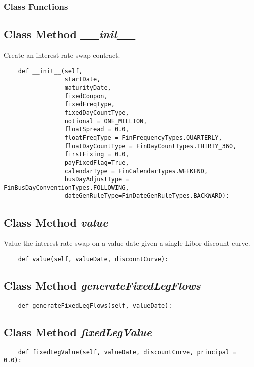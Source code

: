 \documentclass[twoside,11pt]{book}
\begin{document}
\subsubsection{Class Functions}

\subsection{Class Method {\it \_\_init\_\_}}
Create an interest rate swap contract. 

\begin{lstlisting}
    def __init__(self, 
                 startDate, 
                 maturityDate,
                 fixedCoupon, 
                 fixedFreqType, 
                 fixedDayCountType,
                 notional = ONE_MILLION,
                 floatSpread = 0.0, 
                 floatFreqType = FinFrequencyTypes.QUARTERLY, 
                 floatDayCountType = FinDayCountTypes.THIRTY_360,
                 firstFixing = 0.0,
                 payFixedFlag=True,
                 calendarType = FinCalendarTypes.WEEKEND,
                 busDayAdjustType = FinBusDayConventionTypes.FOLLOWING,
                 dateGenRuleType=FinDateGenRuleTypes.BACKWARD):
\end{lstlisting}

\subsection{Class Method {\it value}}
Value the interest rate swap on a value date given a single Libor discount curve. 

\begin{lstlisting}
    def value(self, valueDate, discountCurve):
\end{lstlisting}

\subsection{Class Method {\it generateFixedLegFlows}}


\begin{lstlisting}
    def generateFixedLegFlows(self, valueDate):
\end{lstlisting}

\subsection{Class Method {\it fixedLegValue}}


\begin{lstlisting}
    def fixedLegValue(self, valueDate, discountCurve, principal = 0.0):
\end{lstlisting}
\end{document}
